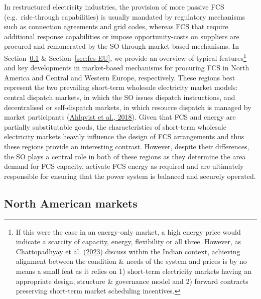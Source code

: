 \documentclass[12pt,a4paper,]{report}
\begin{document}
In restructured electricity industries, the provision of more passive
FCS (e.g.~ride-through capabilities) is usually mandated by regulatory
mechanisms such as connection agreements and grid codes, whereas FCS
that require additional response capabilities or impose
opportunity-costs on suppliers are procured and remunerated by the SO
through market-based mechanisms. In Section~\ref{sec:fcs-NA} \&
Section~\ref{sec:fcs-EU}, we provide an overview of typical
features\footnote{If this were the case in an energy-only market, a high
  energy price would indicate a scarcity of capacity, energy,
  flexibility or all three. However, as Chattopadhyay et al.
  (\protect\hyperlink{ref-chattopadhyaySpotlightSpotMarket2023}{2023})
  discuss within the Indian context, achieving alignment between the
  condition \& needs of the system and prices is by no means a small
  feat as it relies on 1) short-term electricity markets having an
  appropriate design, structure \& governance model and 2) forward
  contracts preserving short-term market scheduling incentives.} and key
developments in market-based mechanisms for procuring FCS in North
America and Central and Western Europe, respectively. These regions best
represent the two prevailing short-term wholesale electricity market
models: central dispatch markets, in which the SO issues dispatch
instructions, and decentralised or self-dispatch markets, in which
resource dispatch is managed by market participants
(\protect\hyperlink{ref-ahlqvistCentralSelfDispatchElectricity2018}{Ahlqvist
et al., 2018}). Given that FCS and energy are partially substitutable
goods, the characteristics of short-term wholesale electricity markets
heavily influence the design of FCS arrangements and thus these regions
provide an interesting contrast. However, despite their differences, the
SO plays a central role in both of these regions as they determine the
area demand for FCS capacity, activate FCS energy as required and are
ultimately responsible for ensuring that the power system is balanced
and securely operated.

\hypertarget{sec:fcs-NA}{%
\subsection{North American markets}\label{sec:fcs-NA}}
\end{document}
